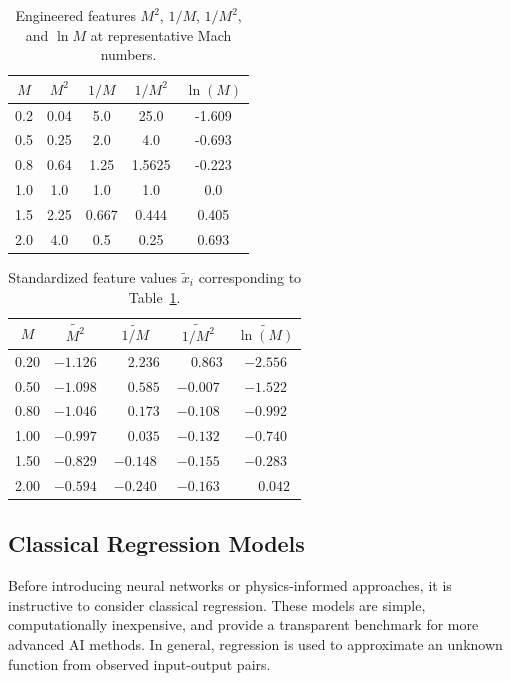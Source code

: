 \documentclass[11pt,a4paper]{report}
\begin{document}
\begin{table}[h!]
\centering
\caption{Engineered features $M^2$, $1/M$, $1/M^2$, and $\ln M$ at representative Mach numbers.}
\label{tab:feature_examples}
\begin{tabular}{c c c c c}
\toprule
$M$ & $M^2$ & $1/M$ & $1/M^2$ & $\ln(M)$ \\
\midrule
0.2  & 0.04   & 5.0    & 25.0   & -1.609 \\
0.5  & 0.25   & 2.0    & 4.0    & -0.693 \\
0.8  & 0.64   & 1.25   & 1.5625 & -0.223 \\
1.0  & 1.0    & 1.0    & 1.0    & \phantom{-}0.0 \\
1.5  & 2.25   & 0.667  & 0.444  & \phantom{-}0.405 \\
2.0  & 4.0    & 0.5    & 0.25   & \phantom{-}0.693 \\
\bottomrule
\end{tabular}
\end{table}

\begin{table}[h!]
\centering
\caption{Standardized feature values $\tilde{x}_i$ corresponding to Table~\ref{tab:feature_examples}.}
\label{tab:standardized_features}
\begin{tabular}{c c c c c}
\toprule
$M$ & $\widetilde{M^2}$ & $\widetilde{1/M}$ & $\widetilde{1/M^2}$ & $\widetilde{\ln(M)}$ \\
\midrule
0.20 & $-1.126$ & $\phantom{-}2.236$  & $\phantom{-}0.863$  & $-2.556$ \\
0.50 & $-1.098$ & $\phantom{-}0.585$  & $-0.007$            & $-1.522$ \\
0.80 & $-1.046$ & $\phantom{-}0.173$  & $-0.108$            & $-0.992$ \\
1.00 & $-0.997$ & $\phantom{-}0.035$  & $-0.132$            & $-0.740$ \\
1.50 & $-0.829$ & $-0.148$            & $-0.155$            & $-0.283$ \\
2.00 & $-0.594$ & $-0.240$            & $-0.163$            & $\phantom{-}0.042$ \\
\bottomrule
\end{tabular}
\end{table}



\subsection{Classical Regression Models}
Before introducing neural networks or physics-informed approaches, it is instructive to consider classical regression. These models are simple, computationally inexpensive, and provide a transparent benchmark for more advanced AI methods. In general, regression is used to approximate an unknown function from observed input-output pairs. 
\end{document}
